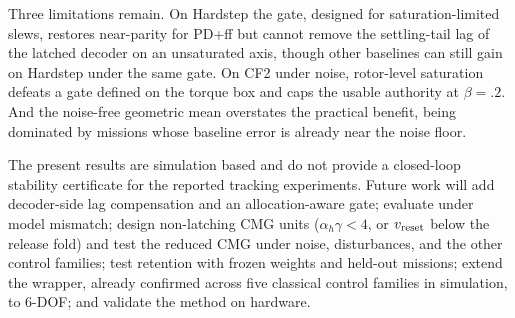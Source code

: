 \documentclass[letterpaper, 10 pt, conference]{ieeeconf}
\begin{document}
Three limitations remain. On Hardstep the gate, designed for saturation-limited slews, restores near-parity for PD+ff but cannot remove the settling-tail lag of the latched decoder on an unsaturated axis, though other baselines can still gain on Hardstep under the same gate. On CF2 under noise, rotor-level saturation defeats a gate defined on the torque box and caps the usable authority at $\beta=.2$. And the noise-free geometric mean overstates the practical benefit, being dominated by missions whose baseline error is already near the noise floor.

The present results are simulation based and do not provide a closed-loop stability certificate for the reported tracking experiments. Future work will add decoder-side lag compensation and an allocation-aware gate; evaluate under model mismatch; design non-latching CMG units ($\alpha_h\gamma<4$, or $v_{\rm reset}$ below the release fold) and test the reduced CMG under noise, disturbances, and the other control families; test retention with frozen weights and held-out missions; extend the wrapper, already confirmed across five classical control families in simulation, to 6-DOF; and validate the method on hardware.






\end{document}
